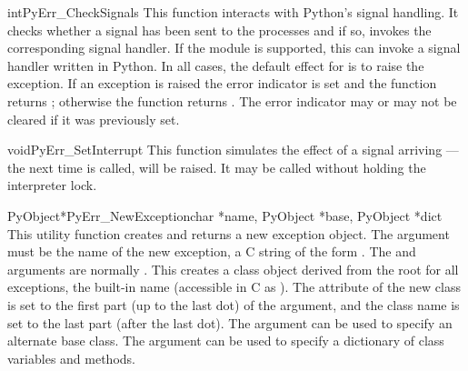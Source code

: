 \begin{cfuncdesc}{int}{PyErr_CheckSignals}{}
  This function interacts with Python's signal handling.  It checks
  whether a signal has been sent to the processes and if so, invokes
  the corresponding signal handler.  If the
   module is supported, this can
  invoke a signal handler written in Python.  In all cases, the
  default effect for  is to raise the
   exception.  If an exception is raised
  the error indicator is set and the function returns ;
  otherwise the function returns .  The error indicator may or
  may not be cleared if it was previously set.
\end{cfuncdesc}

\begin{cfuncdesc}{void}{PyErr_SetInterrupt}{}
  This function simulates the effect of a
   signal arriving --- the next time
   is called,
   will be raised.  It may be called
  without holding the interpreter lock.
\end{cfuncdesc}

\begin{cfuncdesc}{PyObject*}{PyErr_NewException}{char *name,
                                                 PyObject *base,
                                                 PyObject *dict}
  This utility function creates and returns a new exception object.
  The  argument must be the name of the new exception, a C
  string of the form .  The  and
   arguments are normally \NULL.  This creates a class
  object derived from the root for all exceptions, the built-in name
   (accessible in C as ).
  The  attribute of the new class is set to the
  first part (up to the last dot) of the  argument, and the
  class name is set to the last part (after the last dot).  The
   argument can be used to specify an alternate base class.
  The  argument can be used to specify a dictionary of class
  variables and methods.
\end{cfuncdesc}

